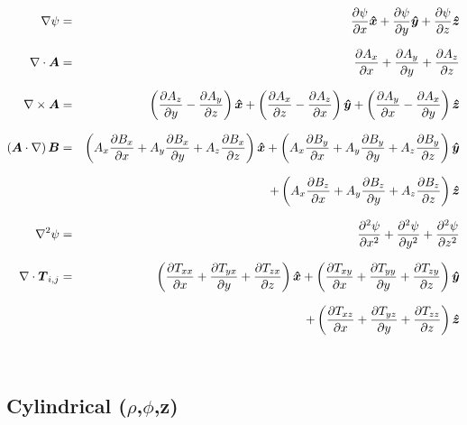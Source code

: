 \begin{eqnarray}
\nabla \psi &=& \frac{\partial\psi}{\partial x}\ux + \frac{\partial\psi}{\partial y}\uy + \frac{\partial\psi}{\partial z}\uz \nonumnext
\nabla \cdot \vA &=& \frac{\partial A_{x}}{\partial x} + \frac{\partial A_{y}}{\partial y} + \frac{\partial A_{z}}{\partial z} \nonumnext
\nabla \times \vA &=& \left( \frac{\partial A_{z}}{\partial y} - \frac{\partial A_{y}}{\partial z} \right)\ux
                    + \left( \frac{\partial A_{x}}{\partial z} - \frac{\partial A_{z}}{\partial x} \right)\uy
                    + \left( \frac{\partial A_{y}}{\partial x} - \frac{\partial A_{x}}{\partial y} \right)\uz \nonumnext
(\vA \cdot \nabla)\, \vB &=& \left( A_{x}\frac{\partial B_{x}}{\partial x} 
                                + A_{y}\frac{\partial B_{x}}{\partial y} 
                                + A_{z}\frac{\partial B_{x}}{\partial z} \right) \ux 
                          +\left( A_{x}\frac{\partial B_{y}}{\partial x} 
                                + A_{y}\frac{\partial B_{y}}{\partial y} 
                                + A_{z}\frac{\partial B_{y}}{\partial z} \right) \uy \nonumnext
                        &&+\left( A_{x}\frac{\partial B_{z}}{\partial x} 
                                + A_{y}\frac{\partial B_{z}}{\partial y} 
                                + A_{z}\frac{\partial B_{z}}{\partial z} \right) \uz \nonumnext
\nabla^{2}\psi &=& \frac{\partial^{2} \psi}{\partial x^{2}} + \frac{\partial^{2} \psi}{\partial y^{2}} + \frac{\partial^{2} \psi}{\partial z^{2}} \nonumnext
\nabla \cdot \boldT_{i,j} &=& 
     \left( \frac{\partial T_{xx}}{\partial x} 
     + \frac{\partial T_{yx}}{\partial y} + \frac{\partial T_{zx}}{\partial z} \right) \ux 
    +\left( \frac{\partial T_{xy}}{\partial x} 
     + \frac{\partial T_{yy}}{\partial y} + \frac{\partial T_{zy}}{\partial z} \right) \uy \nonumnext
    &&+\left( \frac{\partial T_{xz}}{\partial x} 
     + \frac{\partial T_{yz}}{\partial y} + \frac{\partial T_{zz}}{\partial z} \right) \uz \nonumber
\end{eqnarray}


~~~~
\bigskip
\subsection{Cylindrical ($\rho$,$\phi$,z)}

